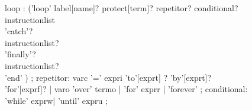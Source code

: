 \begin{figure}[h]
\begin{rail}
loop : ('loop' label[name]? protect[term]?  repetitor? conditional? \\
            instructionlist \\
            'catch'? \\ instructionlist? \\
            'finally'? \\ instructionlist? \\
            'end'
                )
               ;
repetitor: varc '=' expri 'to'[exprt] ? 'by'[exprt]? 'for'[exprf]? |
                varo 'over' termo |
                'for' exprr |
                'forever'
                ;
conditional: 'while' exprw|
                    'until' expru
                ;
\end{rail}
\end{figure}